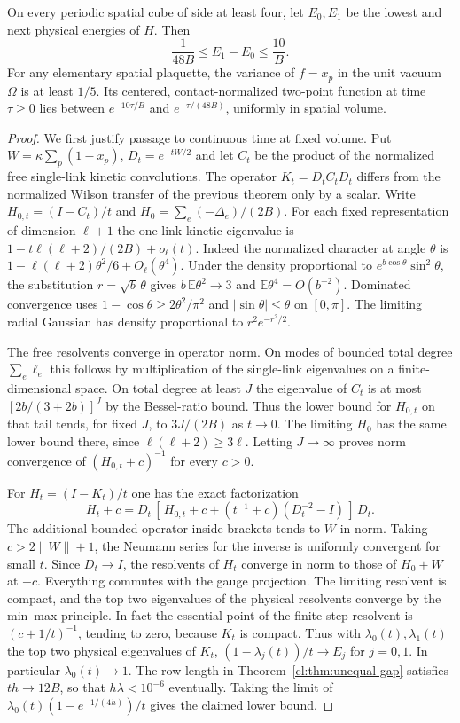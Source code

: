 \begin{theorem}\label{cl:thm:electric-packet}
On every periodic spatial cube of side at least four, let $E_0,E_1$
be the lowest and next physical energies of $H$. Then
\[
 \frac{1}{48B}\le E_1-E_0\le\frac{10}{B}.
\]
For any elementary spatial plaquette, the variance of $f=x_p$ in the
unit vacuum $\Omega$ is at least $1/5$. Its centered, contact-normalized
two-point function at time $\tau\ge0$ lies between
$e^{-10\tau/B}$ and $e^{-\tau/(48B)}$, uniformly in spatial volume.
\end{theorem}
\begin{proof}
We first justify passage to continuous time at fixed volume. Put
$W=\kappa\sum_p(1-x_p)$, $D_t=e^{-tW/2}$ and let $C_t$ be the product
of the normalized free single-link kinetic convolutions. The operator
$K_t=D_tC_tD_t$ differs from the normalized Wilson transfer of the
previous theorem only by a scalar. Write $H_{0,t}=(I-C_t)/t$ and
$H_0=\sum_e(-\Delta_e)/(2B)$. For each fixed representation of
dimension $\ell+1$ the one-link kinetic eigenvalue is
$1-t\ell(\ell+2)/(2B)+o_\ell(t)$. Indeed the normalized character at
angle $\theta$ is $1-\ell(\ell+2)\theta^2/6+O_\ell(\theta^4)$.
Under the density proportional to $e^{b\cos\theta}\sin^2\theta$,
the substitution $r=\sqrt b\,\theta$ gives
$b\,\mathbb E\theta^2\to3$ and $\mathbb E\theta^4=O(b^{-2})$.
Dominated convergence uses $1-\cos\theta\ge2\theta^2/\pi^2$ and
$|\sin\theta|\le\theta$ on $[0,\pi]$. The limiting radial Gaussian
has density proportional to $r^2e^{-r^2/2}$.

The free resolvents converge in operator norm. On modes of bounded
total degree $\sum_e\ell_e$ this follows by multiplication of the
single-link eigenvalues on a finite-dimensional space. On total
degree at least $J$ the eigenvalue of $C_t$ is at most
$[2b/(3+2b)]^J$ by the Bessel-ratio bound. Thus the lower bound for
$H_{0,t}$ on that tail tends, for fixed $J$, to $3J/(2B)$ as $t\to0$.
The limiting $H_0$ has the same lower bound there, since
$\ell(\ell+2)\ge3\ell$. Letting $J\to\infty$ proves norm convergence
of $(H_{0,t}+c)^{-1}$ for every $c>0$.

For $H_t=(I-K_t)/t$ one has the exact factorization
\[
 H_t+c=D_t\,[\,H_{0,t}+c+(t^{-1}+c)(D_t^{-2}-I)\,]\,D_t .
\]
The additional bounded operator inside brackets tends to $W$ in norm.
Taking $c>2\|W\|+1$, the Neumann series for the inverse is uniformly
convergent for small $t$. Since $D_t\to I$, the resolvents of $H_t$
converge in norm to those of $H_0+W$ at $-c$. Everything commutes
with the gauge projection. The limiting resolvent is compact, and
the top two eigenvalues of the physical resolvents converge by the
min--max principle. In fact the essential point of the finite-step
resolvent is $(c+1/t)^{-1}$, tending to zero, because $K_t$ is compact.
Thus with $\lambda_0(t),\lambda_1(t)$ the top two physical eigenvalues
of $K_t$, $(1-\lambda_j(t))/t\to E_j$ for $j=0,1$. In particular
$\lambda_0(t)\to1$. The row length in
Theorem~\ref{cl:thm:unequal-gap} satisfies $th\to12B$, so that
$h\lambda<10^{-6}$ eventually. Taking the limit of
$\lambda_0(t)(1-e^{-1/(4h)})/t$ gives the claimed lower bound.


\end{proof}
